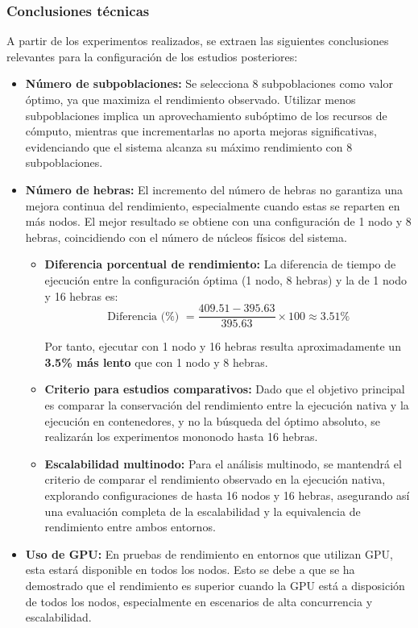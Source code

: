 \subsubsection{Conclusiones técnicas}

A partir de los experimentos realizados, se extraen las siguientes conclusiones relevantes para la configuración de los estudios posteriores:

\begin{itemize}
    \item \textbf{Número de subpoblaciones:} Se selecciona 8 subpoblaciones como valor óptimo, ya que maximiza el rendimiento observado. Utilizar menos subpoblaciones implica un aprovechamiento subóptimo de los recursos de cómputo, mientras que incrementarlas no aporta mejoras significativas, evidenciando que el sistema alcanza su máximo rendimiento con 8 subpoblaciones.

    \item \textbf{Número de hebras:} El incremento del número de hebras no garantiza una mejora continua del rendimiento, especialmente cuando estas se reparten en más nodos. El mejor resultado se obtiene con una configuración de 1 nodo y 8 hebras, coincidiendo con el número de núcleos físicos del sistema.

          \begin{itemize}
              \item \textbf{Diferencia porcentual de rendimiento:} La diferencia de tiempo de ejecución entre la configuración óptima (1 nodo, 8 hebras) y la de 1 nodo y 16 hebras es:
                    \[
                        \text{Diferencia (\%) } = \frac{409.51 - 395.63}{395.63} \times 100 \approx 3.51\mathrm{\%}
                    \]


                    Por tanto, ejecutar con 1 nodo y 16 hebras resulta aproximadamente un \textbf{3.5\% más lento} que con 1 nodo y 8 hebras.

              \item \textbf{Criterio para estudios comparativos:} Dado que el objetivo principal es comparar la conservación del rendimiento entre la ejecución nativa y la ejecución en contenedores, y no la búsqueda del óptimo absoluto, se realizarán los experimentos mononodo hasta 16 hebras.

              \item \textbf{Escalabilidad multinodo:} Para el análisis multinodo, se mantendrá el criterio de comparar el rendimiento observado en la ejecución nativa, explorando configuraciones de hasta 16 nodos y 16 hebras, asegurando así una evaluación completa de la escalabilidad y la equivalencia de rendimiento entre ambos entornos.
          \end{itemize}

    \item \textbf{Uso de GPU:} En pruebas de rendimiento en entornos que utilizan GPU, esta estará disponible en todos los nodos. Esto se debe a que se ha demostrado que el rendimiento es superior cuando la GPU está a disposición de todos los nodos, especialmente en escenarios de alta concurrencia y escalabilidad.
\end{itemize}




